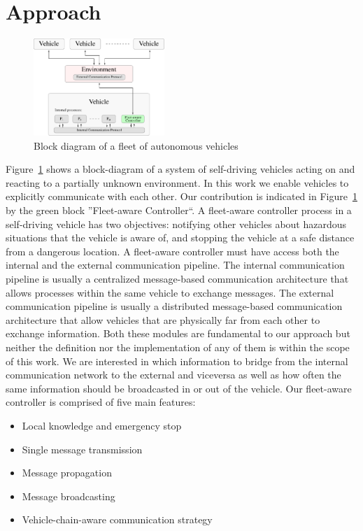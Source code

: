 \section{Approach}
\label{sec:solution}

\begin{figure}[t]
    \centering
    \vspace{0.2cm}
    \includegraphics[width=0.44\textwidth]{figures/model.pdf}
    \caption{Block diagram of a fleet of autonomous vehicles  \label{fig:model_block_diagram}}
\end{figure}

Figure~\ref{fig:model_block_diagram} shows a block-diagram of a system of self-driving vehicles acting on and reacting to
a partially unknown environment. In this work we enable vehicles to explicitly communicate with each other. Our contribution
is indicated in Figure~\ref{fig:model_block_diagram} by the green block ''Fleet-aware Controller``.
A fleet-aware controller process in a self-driving vehicle has two objectives: notifying other vehicles about
hazardous situations that the vehicle is aware of, and stopping the vehicle at a safe distance from a dangerous location.
A fleet-aware controller must have access both the internal and the external communication pipeline. The internal communication
pipeline is usually a centralized message-based communication architecture that allows processes within the same vehicle to exchange
messages. The external communication pipeline is usually a distributed message-based communication architecture that allow
vehicles that are physically far from each other to exchange information. 
Both these modules are fundamental to our approach but neither the definition nor the implementation of any of them is within
the scope of this work.
We are interested in which information to bridge from the internal communication network to the external and viceversa as well as
how often the same information should be broadcasted in or out of the vehicle.
Our fleet-aware controller is comprised of five main features:

\begin{itemize}
\item Local knowledge and emergency stop
\item Single message transmission
\item Message propagation
\item Message broadcasting
\item Vehicle-chain-aware communication strategy
\end{itemize}

